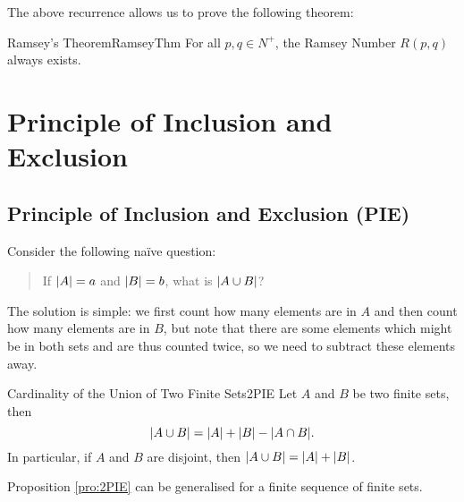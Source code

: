 \documentclass[math]{amznotes}
\theoremstyle{remark}
\begin{document}
The above recurrence allows us to prove the following theorem:
\begin{thmbox}{Ramsey's Theorem}{RamseyThm}
    For all $p, q \in N^+$, the Ramsey Number $R(p, q)$ always exists.
\end{thmbox}

\chapter{Principle of Inclusion and Exclusion}
\section{Principle of Inclusion and Exclusion (PIE)}
Consider the following naïve question:
\begin{quote}
    If ${\left\lvert {A} \right\rvert} = a$ and ${\left\lvert {B} \right\rvert} = b$, what is ${\left\lvert {A \cup B} \right\rvert}$?
\end{quote}
The solution is simple: we first count how many elements are in $A$ and then count how many elements are in $B$, but note that there are some elements which might be in both sets and are thus counted twice, so we need to subtract these elements away.
\begin{probox}{Cardinality of the Union of Two Finite Sets}{2PIE}
    Let $A$ and $B$ be two finite sets, then
    \begin{equation*}
        {\left\lvert {A \cup B} \right\rvert} = {\left\lvert {A} \right\rvert} + {\left\lvert {B} \right\rvert} - {\left\lvert {A \cap B} \right\rvert}.
    \end{equation*}
    In particular, if $A$ and $B$ are disjoint, then ${\left\lvert {A \cup B} \right\rvert} = {\left\lvert {A} \right\rvert} + {\left\lvert {B} \right\rvert}$.
\end{probox}
Proposition \ref{pro:2PIE} can be generalised for a finite sequence of finite sets.
\end{document}
